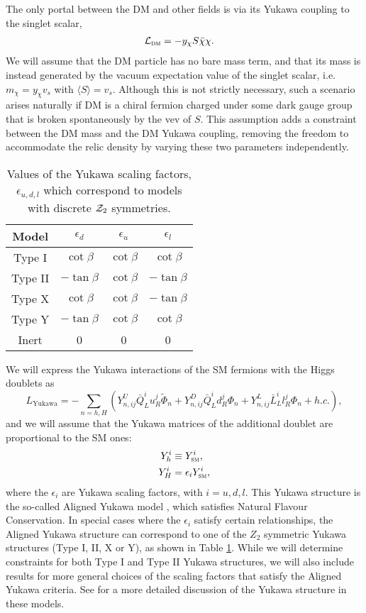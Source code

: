 The only portal between the DM and other fields is via its Yukawa
coupling to the singlet scalar,
\begin{align}
\mathcal{L}_{\text{\textsc{dm}}} &= -y_\chi S \bar{\chi} \chi.
\end{align}
We will assume that the DM particle has no bare mass term, and that its mass is instead generated by the vacuum expectation value of the singlet scalar, i.e. $m_\chi = y_\chi v_s$ with $\langle S \rangle = v_s$. Although this is not strictly necessary, such a scenario arises naturally if DM is a chiral fermion charged under some dark gauge group that is broken spontaneously by the vev of $S$. This assumption adds a constraint between the DM mass and the DM Yukawa coupling, removing the freedom to accommodate the relic density by varying these two parameters independently. 

\begin{table}[tb]\centering
\begin{tabular}{|c|c|c|c|}
\hline
Model & $\epsilon_d$ & $\epsilon_u$ & $\epsilon_l$
\\ \hline
Type I & $\cot\beta$ & $\cot\beta$ & $\cot\beta$
\\
Type II & $-\tan\beta$ & $\cot\beta$ & $-\tan\beta$
\\
Type X & $\cot\beta$ & $\cot\beta$ & $-\tan\beta$
\\
Type Y & $-\tan\beta$ & $\cot\beta$ & $\cot\beta$
\\
Inert & 0 & 0 & 0
\\ \hline
\end{tabular}
\caption{Values of the Yukawa scaling factors, $\epsilon_{u,d,l}$ which
  correspond to models with discrete ${\cal Z}_2$
  symmetries.}\label{tab:coeffs}
\end{table}

We will express the Yukawa interactions of the SM fermions with the Higgs doublets as
\begin{equation}
L_{\text{Yukawa}} = - \sum_{n=h,H} \left(Y_{n,ij}^U \bar{Q}_L^i u_R^j \widetilde{\Phi}_n
+ Y_{n,ij}^D \bar{Q}_L^i d_R^j \Phi_n
+ Y_{n,ij}^L \bar{L}_L^i l_R^j \Phi_n + h.c. \right),
\label{eq:yukawah1h2}
\end{equation}
and we will assume that the Yukawa matrices of the additional doublet are proportional to the SM ones: 
\begin{align}
Y_h^i & \equiv Y_{\text{\textsc{sm}}}^i,\\
Y_H^i & = \epsilon_i Y_{\text{\textsc{sm}}}^i,
\end{align}
where the $\epsilon_i$ are Yukawa scaling factors, with $i=u,d,l$. This Yukawa structure is the so-called Aligned Yukawa model \citep{Pich:2009sp,Tuzon:2010vt,Pich:2010ic,Penuelas:2017ikk,Gori:2017qwg}, which satisfies Natural Flavour Conservation. In special cases where the $\epsilon_i$ satisfy certain relationships, the Aligned Yukawa structure can correspond to one of the $Z_2$ symmetric Yukawa structures (Type I, II, X or Y), as shown in Table \ref{tab:coeffs}. While we will determine constraints for both Type I and Type II Yukawa structures, we will also include results for more general choices of the scaling factors that satisfy the Aligned Yukawa criteria. See \citep{Bell:2016ekl} for a more detailed discussion of the Yukawa structure in these models.